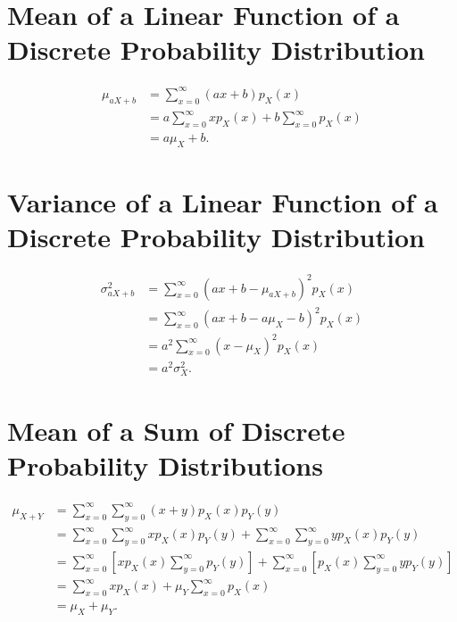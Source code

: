 \documentclass{myart}
\newcommand{\mean}{\mu}
\newcommand{\variance}{\sigma^2}
\begin{document}

\section{Mean of a Linear Function of a Discrete Probability Distribution}

\begin{align*}
\mean_{aX+b} &= \sum_{x=0}^\infty (ax + b) p_X(x) \\
&= a \sum_{x=0}^\infty x p_X(x) + b \sum_{x=0}^\infty p_X(x) \\
&= a \mean_X + b.
\end{align*}

\section{Variance of a Linear Function of a Discrete Probability Distribution}

\begin{align*}
\variance_{aX+b} &= \sum_{x=0}^\infty (ax + b - \mean_{aX+b})^2 p_X(x) \\
&= \sum_{x=0}^\infty (ax + b - a \mean_X - b)^2 p_X(x) \\
&= a^2 \sum_{x=0}^\infty (x - \mean_X)^2 p_X(x) \\
&= a^2 \variance_X.
\end{align*}

\section{Mean of a Sum of Discrete Probability Distributions}

\begin{align*}
\mean_{X+Y} &= \sum_{x=0}^\infty \sum_{y=0}^\infty (x + y) p_X(x) p_Y(y) \\
&= \sum_{x=0}^\infty \sum_{y=0}^\infty x p_X(x) p_Y(y) + \sum_{x=0}^\infty \sum_{y=0}^\infty y p_X(x) p_Y(y) \\
&= \sum_{x=0}^\infty \left[x p_X(x) \sum_{y=0}^\infty p_Y(y)\right] + \sum_{x=0}^\infty \left[p_X(x) \sum_{y=0}^\infty y p_Y(y)\right] \\
&= \sum_{x=0}^\infty x p_X(x) + \mean_Y \sum_{x=0}^\infty p_X(x) \\
&= \mean_X + \mean_Y.
\end{align*}
\end{document}
